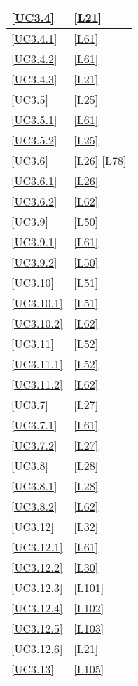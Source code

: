 \begin{longtable}{|P{6cm}|P{6cm}|}
	\hline \ref{UC3.4} & \ref{L21} \\
	\hline \ref{UC3.4.1} & \ref{L61} \\
	\hline \ref{UC3.4.2} & \ref{L61} \\
	\hline \ref{UC3.4.3} & \ref{L21} \\
	\hline \ref{UC3.5} & \ref{L25} \\
	\hline \ref{UC3.5.1} & \ref{L61} \\
	\hline \ref{UC3.5.2} & \ref{L25} \\
	\hline \ref{UC3.6} & \ref{L26} \linebreak \ref{L78} \\
	\hline \ref{UC3.6.1} & \ref{L26} \\
	\hline \ref{UC3.6.2} & \ref{L62} \\
	\hline \ref{UC3.9} & \ref{L50} \\
	\hline \ref{UC3.9.1} & \ref{L61} \\
	\hline \ref{UC3.9.2} & \ref{L50} \\
	\hline \ref{UC3.10} & \ref{L51} \\
	\hline \ref{UC3.10.1} & \ref{L51} \\
	\hline \ref{UC3.10.2} & \ref{L62} \\
	\hline \ref{UC3.11} & \ref{L52} \\
	\hline \ref{UC3.11.1} & \ref{L52} \\
	\hline \ref{UC3.11.2} & \ref{L62} \\
	\hline \ref{UC3.7} & \ref{L27} \\
	\hline \ref{UC3.7.1} & \ref{L61} \\
	\hline \ref{UC3.7.2} & \ref{L27} \\
	\hline \ref{UC3.8} & \ref{L28} \\
	\hline \ref{UC3.8.1} & \ref{L28} \\
	\hline \ref{UC3.8.2} & \ref{L62} \\
	\hline \ref{UC3.12} & \ref{L32} \\
	\hline \ref{UC3.12.1} & \ref{L61} \\
	\hline \ref{UC3.12.2} & \ref{L30} \\
	\hline \ref{UC3.12.3} & \ref{L101} \\
	\hline \ref{UC3.12.4} & \ref{L102} \\
	\hline \ref{UC3.12.5} & \ref{L103} \\
	\hline \ref{UC3.12.6} & \ref{L21} \\
	\hline \ref{UC3.13} & \ref{L105} \\

\end{longtable}
